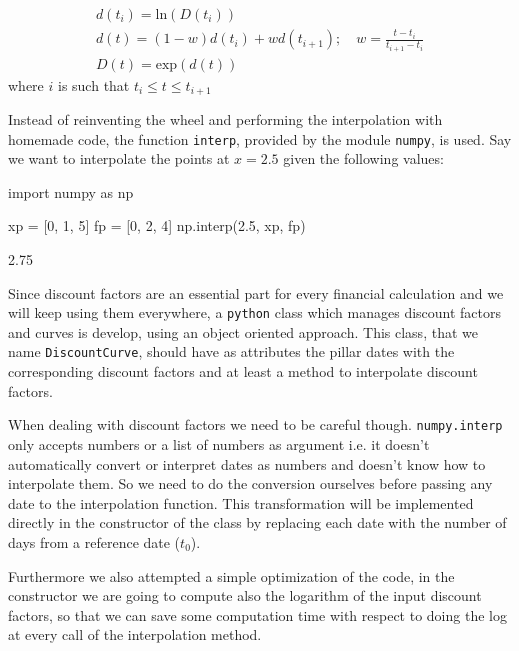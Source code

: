 \begin{equation}
\begin{gathered}
d(t_i)=\mathrm{ln}(D(t_i))\\
d(t) = (1-w)d(t_i) + wd(t_{i+1});\quad w=\frac{t-t_i}{t_{i+1}-t_i}\\
D(t) = \mathrm{exp}(d(t))
\end{gathered}
\end{equation}
where \(i\) is such that \(t_i \le t \le t_{i+1}\)

Instead of reinventing the wheel and performing the interpolation with homemade code, 
the function \texttt{interp}, provided by the module \texttt{numpy}, is used. 
Say we want to interpolate the points at $x = 2.5$ given the following values:

\begin{ipython}
import numpy as np

xp = [0, 1, 5]
fp = [0, 2, 4]
np.interp(2.5, xp, fp)
\end{ipython}
\begin{ioutput}
2.75
\end{ioutput}

Since discount factors are an essential part for every financial calculation and we will keep using them everywhere, a \texttt{python} class which manages discount factors and curves is develop, using an object oriented approach.
This class, that we name \texttt{DiscountCurve}, should have as attributes the pillar dates with the corresponding discount factors and at least a method to interpolate discount factors.

When dealing with discount factors we need to be careful though. \texttt{numpy.interp} only accepts numbers or a list of numbers as argument i.e. it doesn't automatically convert or interpret dates as numbers and doesn't know how to interpolate them. So we need to do the conversion ourselves before passing any date to the interpolation function. This transformation will be implemented directly in the constructor of the class by replacing each date with the number of days from a reference date ($t_0$).

Furthermore we also attempted a simple optimization of the code, in the constructor we are going to compute also the logarithm of the input discount factors, so that we can save some computation time with respect to doing the log at every call of the interpolation method. 

